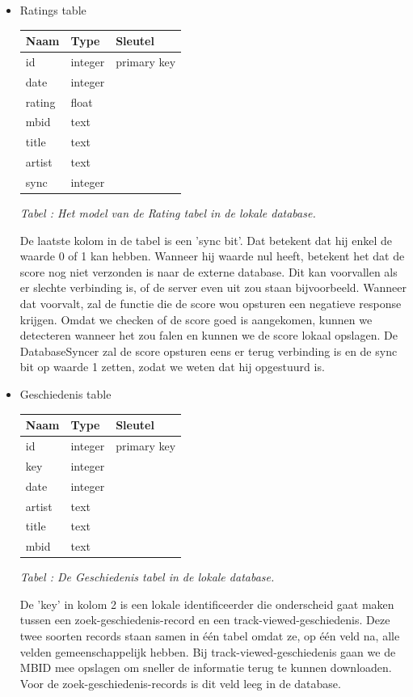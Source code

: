\documentclass[11pt,a4paper]{article}
\newcounter{tabc}
\newcommand{\increaseTabID} {%
   \stepcounter{tabc}%
   \thetabc}
\newcommand{\tabID}[1]{\small \textit{Tabel \increaseTabID : #1} \\ \normalsize}
\begin{document}
	 \begin{itemize}
		\item Ratings table \newline
		
		\begin{tabular}{| l | l | l | }
		\hline
		 Naam		& Type		& Sleutel		\\
		 \hline 
		 id 		& integer 	& primary key 	\\
		 date 		& integer	& 				\\
		 rating 	& float 	& 				\\
		 mbid 		& text 		& 				\\
		 title 		& text 		& 				\\
		 artist 	& text 		& 				\\
		 sync		& integer 	& 				\\
		 \hline
		\end{tabular} \newline
		\tabID{Het model van de Rating tabel in de lokale database.}  

		De laatste kolom in de tabel is een 'sync bit'. Dat betekent dat hij enkel de waarde 0 of 1 kan hebben. Wanneer hij waarde nul heeft, betekent het dat de score nog niet verzonden is naar de externe database. Dit kan voorvallen als er slechte verbinding is, of de server even uit zou staan bijvoorbeeld. Wanneer dat voorvalt, zal de functie die de score wou opsturen een negatieve response krijgen. Omdat we checken of de score goed is aangekomen, kunnen we detecteren wanneer het zou falen en kunnen we de score lokaal opslagen. De DatabaseSyncer zal de score opsturen eens er terug verbinding is en de sync bit op waarde 1 zetten, zodat we weten dat hij opgestuurd is. 
		
		\item Geschiedenis table \\
		
		\begin{tabular}{| l | l | l | }
		\hline
		Naam	& Type		& Sleutel		\\
		\hline
		id 		& integer 	& primary key 	\\
		key		& integer	&				\\
		date 	& integer 	& 				\\
		artist 	& text 		& 				\\
		title 	& text 		& 				\\
		mbid 	& text 		& 				\\
		\hline
		\end{tabular} \newline
		\tabID{De Geschiedenis tabel in de lokale database.} 
	
		De 'key' in kolom 2 is een lokale identificeerder die onderscheid gaat maken tussen een zoek-geschiedenis-record en een track-viewed-geschiedenis. Deze twee soorten records staan samen in één tabel omdat ze, op één veld na, alle velden gemeenschappelijk hebben. Bij track-viewed-geschiedenis gaan we de MBID mee opslagen om sneller de informatie terug te kunnen downloaden. Voor de zoek-geschiedenis-records is dit veld leeg in de database.
	 \end{itemize}
	
\end{document}
